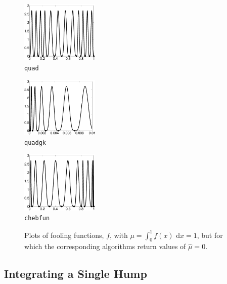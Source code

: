 \documentclass[graybox]{svmult}
\newcommand{\rd}{\,\mathrm{d}}
\newcommand{\hmu}{\hat{\mu}}
\newcommand{\dif}{\rd}
\begin{document}
\begin{figure}
\centering
\begin{minipage}{3.7cm} \centering \includegraphics[width=3.7cm]{137Foolquadbw.eps} \\ {\tt quad} \end{minipage}
\begin{minipage}{3.7cm} \centering \includegraphics[width=3.7cm]{137Foolquadgkbw.eps} \\ {\tt quadgk} \end{minipage}
\begin{minipage}{3.7cm} \centering \includegraphics[width=3.7cm]{137Foolchebintbw.eps} \\ {\tt chebfun} \end{minipage}
\caption{Plots of fooling functions, $f$, with $\mu=\int_0^1 f(x) \, \dif x=1$, but for which the corresponding algorithms return values of $\hmu=0$. \label{foolfunfig}}
\end{figure}

\subsection{Integrating a Single Hump}
\end{document}
